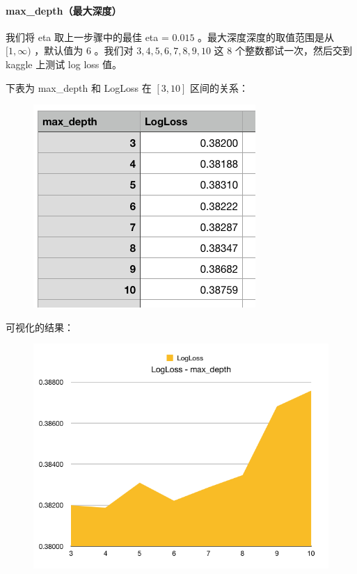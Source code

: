 \documentclass{article}
\begin{document}
\paragraph{max\_depth（最大深度）}

我们将 eta 取上一步骤中的最佳 eta = $0.015$ 。最大深度深度的取值范围是从 $[1, \infty)$ ，默认值为 $6$ 。我们对 $3, 4, 5, 6, 7, 8, 9, 10$ 这 $8$ 个整数都试一次，然后交到 kaggle 上测试 log loss 值。

下表为 max\_depth 和 LogLoss 在 $[3, 10]$ 区间的关系：

\begin{figure}[!h]
\centering
\includegraphics[scale=0.5]{tu8.png}
\end{figure}

\newpage

可视化的结果：

\begin{figure}[!h]
\centering
\includegraphics[scale=0.5]{tu7.png}
\end{figure}
\end{document}
